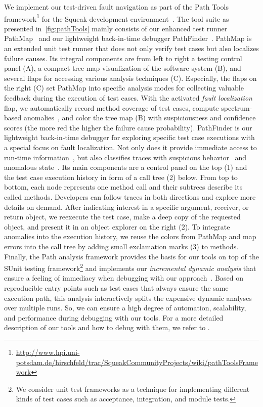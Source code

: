 \documentclass[preprint,3p]{elsarticle}
\begin{document}
We implement our test-driven fault navigation as part of the Path Tools
framework\footnote{\url{http://www.hpi.uni-potsdam.de/hirschfeld/trac/SqueakCommunityProjects/wiki/pathToolsFramework}}
for the Squeak development environment~\cite{Ingalls1997}.  The tool suite as
presented in \figurename\,\ref{fig:pathTools} mainly consists of our enhanced
test runner PathMap~\cite{Perscheid12Tqf} and our lightweight back-in-time
debugger PathFinder~\cite{Perscheid2010}.
PathMap is an extended unit test runner that does not only verify test cases but
also localizes failure causes.  Its integral components are from left to right a
testing control panel (A), a compact tree map visualization of the software
system (B), and several flaps for accessing various analysis techniques (C).
Especially, the flaps on the right (C) set PathMap into specific analysis modes
for collecting valuable feedback during the execution of test cases.  With the
activated \emph{fault localization} flap, we automatically record method
coverage of test cases, compute spectrum-based anomalies~\cite{Jones2002Vti},
and color the tree map (B) with suspiciousness and confidence scores (the more
red the higher the failure cause probability).
PathFinder is our lightweight back-in-time debugger for exploring specific test
case executions with a special focus on fault localization.  Not only does it
provide immediate access to run-time information~\cite{Perscheid2010}, but also
classifies traces with suspicious behavior~\cite{Perscheid} and anomalous
state~\cite{Perscheid14aFtp}.  Its main components are a control panel on the
top (1) and the test case execution history in form of a call tree (2) below.
From top to bottom, each node represents one method call and their subtrees
describe its called methods.  Developers can follow traces in both directions
and explore more details on demand.  After indicating interest in a specific
argument, receiver, or return object, we reexecute the test case, make a deep
copy of the requested object, and present it in an object explorer on the right
(2).  To integrate anomalies into the execution history, we reuse the colors
from PathMap and map errors into the call tree by adding small exclamation marks
(3) to methods.
Finally, the Path analysis framework provides the basis for our tools on top of
the SUnit testing framework\footnote{We consider unit test frameworks as a
  technique for implementing different kinds of test cases such as acceptance,
  integration, and module tests.} and implements our \emph{incremental dynamic
  analysis} that ensure a feeling of immediacy when debugging with our
approach~\cite{Perscheid13}.  Based on reproducible entry points such as test
cases that always ensure the same execution path, this analysis interactively
splits the expensive dynamic analyses over multiple runs.  So, we can ensure a
high degree of automation, scalability, and performance during debugging with
our tools.  For a more detailed description of our tools and how to debug with
them, we refer to \cite{Perscheid14bFtp}.
\end{document}
